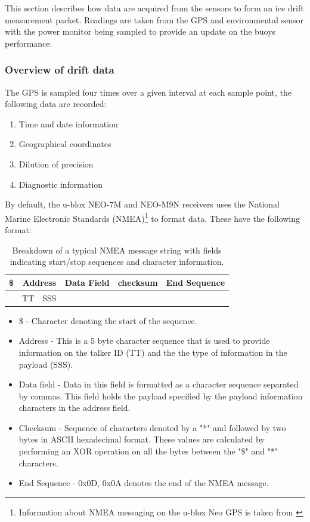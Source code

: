 This section describes how data are acquired from the sensors to form an ice drift measurement packet. Readings are taken from the GPS and environmental sensor with the power monitor being sampled to provide an update on the buoys performance.\par 

\subsubsection{Overview of drift data}

The GPS is sampled four times over a given interval at each sample point, the following data are recorded:


\begin{enumerate}
	\item Time and date information
	\item Geographical coordinates
	\item Dilution of precision
	\item Diagnostic information
\end{enumerate}

By default, the u-blox NEO-7M and NEO-M9N receivers uses the National Marine Electronic Standards (NMEA)\footnote{Information about NMEA messaging on the u-blox Neo GPS is taken from \cite{UBLOX_M9N_INTERFACE}} to format data. These have the following format:

\begin{table}[H]
	\centering
	\caption{ Breakdown of a typical NMEA message string with fields indicating start/stop sequences and character information.}
	\begin{tabular}{|c|c|c|c|c|c|}
		\hline
		\$  & \multicolumn{2}{|c|}{Address} & Data Field & checksum & End Sequence\\
		\hline
		\multicolumn{1}{c|}{} & TT & SSS &\multicolumn{3}{c}{} \\
		\cline{2-3}
	\end{tabular}
	\label{tab:GPS_data_format}
\end{table}
\begin{itemize}
	\item \$ - Character denoting the start of the sequence.
	\item Address - This is a 5 byte character sequence that is used to provide information on the talker ID (TT) and the the type of information in the payload (SSS).
	\item Data field - Data in this field is formatted as a character sequence separated by commas. This field holds the payload specified by the payload information characters in the address field.
	\item Checksum - Sequence of characters denoted by a "*" and followed by two bytes in ASCII hexadecimal format. These values are calculated by performing an XOR operation on all the bytes between the "\$" and "*" characters.
	\item End Sequence - 0x0D, 0x0A denotes the end of the NMEA message.
\end{itemize}

